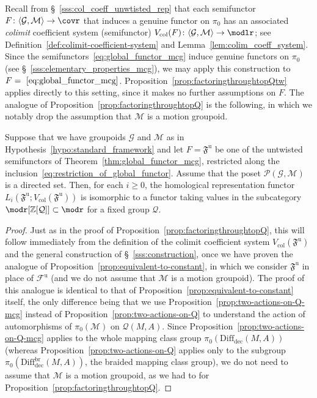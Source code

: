 \documentclass[AHL,Unicode,published]{cedram}
\newcommand{\col}{\mathrm{col}}
\newcommand{\unt}{\mathrm{u}}
\newcommand{\rdec}{\mathrm{dec}}
\newcommand{\fF}{\mathfrak{F}}
\newcommand{\cF}{\mathcal{F}}
\newcommand{\cG}{\mathcal{G}}
\newcommand{\cM}{\mathcal{M}}
\newcommand{\cP}{\mathcal{P}}
\newcommand{\cQ}{\mathcal{Q}}
\newcommand{\bZ}{\mathbb{Z}}
\newcommand{\diffdec}{\ensuremath{\mathrm{Diff}_{\rdec}}}
\newcommand{\diffdecbr}{\ensuremath{\mathrm{Diff}_{\rdec}^{\mathrm{br}}}}
\renewcommand{\geq}{\geqslant}
\begin{document}
Recall from \S~\ref{sss:col_coeff_unwtisted_rep} that each semifunctor $F \colon \langle \cG, \cM \rangle \to \covr$ that induces a genuine functor on $\pi_{0}$ has an associated \emph{colimit} coefficient system (semifunctor) $V_{\col}(F) \colon \langle \cG, \cM \rangle \to \modlr$; see Definition~\ref{def:colimit-coefficient-system} and Lemma~\ref{lem:colim_coeff_system}. Since the semifunctors~\eqref{eq:global_functor_mcg} induce genuine functors on $\pi_{0}$ (see \S~\ref{sss:elementary_properties_mcg}), we may apply this construction to $F =~\eqref{eq:global_functor_mcg}$. Proposition~\ref{prop:factoringthroughtopQtw} applies directly to this setting, since it makes no further assumptions on $F$. The analogue of Proposition~\ref{prop:factoringthroughtopQ} is the following, in which we notably drop the assumption that $\cM$ is a motion groupoid.

\begin{prop}\label{prop:factoringthroughcovQ-mcg}
Suppose that we have groupoids $\cG$ and $\cM$ as in Hypothesis~\ref{hypo:standard_framework} and let $F = \fF^{\unt}$ be one of the untwisted semifunctors of Theorem~\ref{thm:global_functor_mcg}, restricted along the inclusion~\eqref{eq:restriction_of_global_functor}. Assume that the poset $\cP(\cG,\cM)$ is a directed set. Then, for each $i\geq 0$, the homological representation functor $L_i(\fF^{\unt};V_{\col}(\fF^{\unt}))$ is isomorphic to a functor taking values in the subcategory $\modr[\bZ[\cQ]] \subset \modr$ for a fixed group $\cQ$.
\end{prop}

\begin{proof}
Just as in the proof of Proposition~\ref{prop:factoringthroughtopQ}, this will follow immediately from the definition of the colimit coefficient system $V_{\col}(\fF^{\unt})$ and the general construction of \S~\ref{sss:construction}, once we have proven the analogue of Proposition~\ref{prop:equivalent-to-constant}, in which we consider $\fF^{\unt}$ in place of $\cF^{\unt}$ (and we do not assume that $\cM$ is a motion groupoid). The proof of this analogue is identical to that of Proposition~\ref{prop:equivalent-to-constant} itself, the only difference being that we use Proposition~\ref{prop:two-actions-on-Q-mcg} instead of Proposition~\ref{prop:two-actions-on-Q} to understand the action of automorphisms of $\pi_{0}(\cM)$ on $\cQ(M,A)$. Since Proposition~\ref{prop:two-actions-on-Q-mcg} applies to the whole mapping class group $\pi_{0}(\diffdec(M,A))$ (whereas Proposition~\ref{prop:two-actions-on-Q} applies only to the subgroup $\pi_{0}(\diffdecbr(M,A))$, the braided mapping class group), we do not need to assume that $\cM$ is a motion groupoid, as we had to for Proposition~\ref{prop:factoringthroughtopQ}.
\end{proof}
\end{document}

